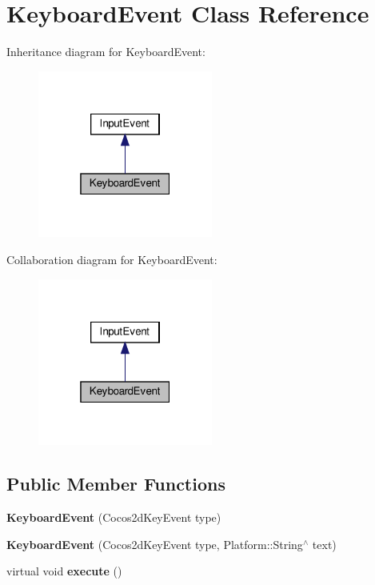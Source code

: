 \hypertarget{classKeyboardEvent}{}\section{Keyboard\+Event Class Reference}
\label{classKeyboardEvent}


Inheritance diagram for Keyboard\+Event\+:
\nopagebreak
\begin{figure}[H]
\begin{center}
\leavevmode
\includegraphics[width=163pt]{classKeyboardEvent__inherit__graph}
\end{center}
\end{figure}


Collaboration diagram for Keyboard\+Event\+:
\nopagebreak
\begin{figure}[H]
\begin{center}
\leavevmode
\includegraphics[width=163pt]{classKeyboardEvent__coll__graph}
\end{center}
\end{figure}
\subsection*{Public Member Functions}
\begin{DoxyCompactItemize}
\item 
\mbox{\label{classKeyboardEvent_aefeed0c4f222533130b1ea3a514a720d}} 
{\bfseries Keyboard\+Event} (Cocos2d\+Key\+Event type)
\item 
\mbox{\label{classKeyboardEvent_aefee964144f3d7b8031de19f485eeda4}} 
{\bfseries Keyboard\+Event} (Cocos2d\+Key\+Event type, Platform\+::\+String$^\wedge$ text)
\item 
\mbox{\label{classKeyboardEvent_ae68d7a9b236abbd3a264b2f65c6031c0}} 
virtual void {\bfseries execute} ()
\end{DoxyCompactItemize}


